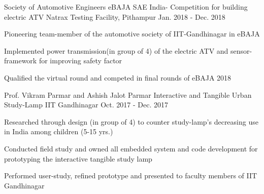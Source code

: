 \begin{cventries}

  \cventry
    {Society of Automotive Engineers} %
    {eBAJA SAE India- Competition for building electric ATV  {}} %
    {Natrax Testing Facility, Pithampur} %
    {Jan. 2018 - Dec. 2018} %
    {\begin{cvitems}
      \item {Pioneering team-member of the automotive society of IIT-Gandhinagar in eBAJA }
    \item {Implemented power transmission(in group of 4) of the electric ATV and sensor-framework for improving safety factor}
    \item {Qualified the virtual round and competed in final rounds of eBAJA 2018}
     \end{cvitems}
    }
    

  \cventry
    {Prof. Vikram Parmar and Ashish Jalot Parmar} %
    {Interactive and Tangible Urban Study-Lamp   } %
    {IIT Gandhinagar} %
    {Oct. 2017 - Dec. 2017} %
    {
      \begin{cvitems} %
        \item {Researched through design (in group of 4) to counter study-lamp's decreasing use in India among children (5-15 yrs.)}
        \item {Conducted field study and owned all embedded system and code development for prototyping the interactive tangible study lamp }
        \item{Performed user-study, refined prototype and presented to faculty members of IIT Gandhinagar}
      \end{cvitems}
    }
    

\end{cventries}
